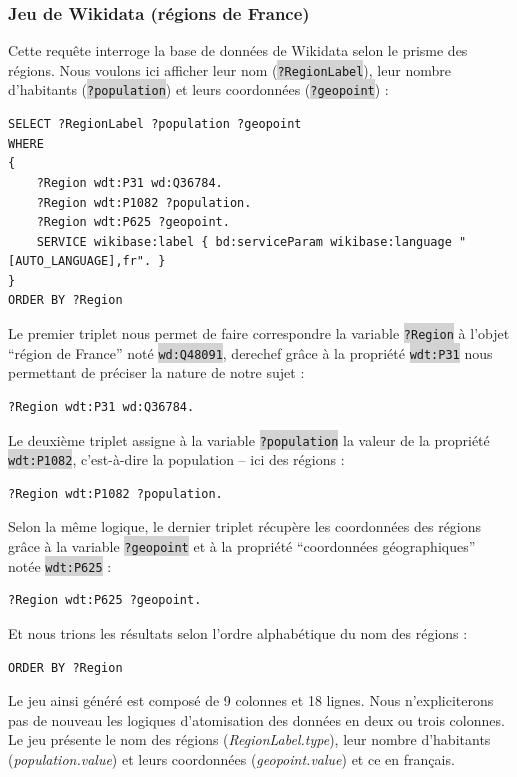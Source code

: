 \documentclass[hidelinks, 12pt]{article}
\newcommand{\code}[1]{\colorbox{LightGray}{\texttt{#1}}}
\begin{document}
\subsubsection{Jeu de Wikidata (régions de France)}

\label{queryfr}Cette requête interroge la base de données de Wikidata selon le prisme des régions. Nous voulons ici afficher leur nom (\code{?RegionLabel}), leur nombre d'habitants (\code{?population}) et leurs coordonnées (\code{?geopoint}) :

\begin{lstlisting}[language=SPARQL]
SELECT ?RegionLabel ?population ?geopoint
WHERE 
{
	?Region wdt:P31 wd:Q36784.
	?Region wdt:P1082 ?population.
	?Region wdt:P625 ?geopoint.
	SERVICE wikibase:label { bd:serviceParam wikibase:language "[AUTO_LANGUAGE],fr". }
}
ORDER BY ?Region
\end{lstlisting}

Le premier triplet nous permet de faire correspondre la variable \code{?Region} à l'objet \enquote{région de France} noté \code{wd:Q48091}, derechef grâce à la propriété \code{wdt:P31} nous permettant de préciser la nature de notre sujet :

\begin{lstlisting}[language=SPARQL]
	?Region wdt:P31 wd:Q36784.
\end{lstlisting}

Le deuxième triplet assigne à la variable \code{?population} la valeur de la propriété \code{wdt:P1082}, c'est-à-dire la population -- ici des régions :

\begin{lstlisting}[language=SPARQL]
	?Region wdt:P1082 ?population.
\end{lstlisting}

Selon la même logique, le dernier triplet récupère les coordonnées des régions grâce à la variable \code{?geopoint} et à la propriété \enquote{coordonnées géographiques} notée \code{wdt:P625} :

\begin{lstlisting}[language=SPARQL]
	?Region wdt:P625 ?geopoint.
\end{lstlisting}

Et nous trions les résultats selon l'ordre alphabétique du nom des régions :

\begin{lstlisting}[language=SPARQL]
	ORDER BY ?Region
\end{lstlisting}

Le jeu ainsi généré est composé de 9 colonnes et 18 lignes. Nous n'expliciterons pas de nouveau les logiques d'atomisation des données en deux ou trois colonnes. Le jeu présente le nom des régions (\textit{RegionLabel.type}), leur nombre d'habitants (\textit{population.value}) et leurs coordonnées (\textit{geopoint.value}) et ce en français.
\end{document}
